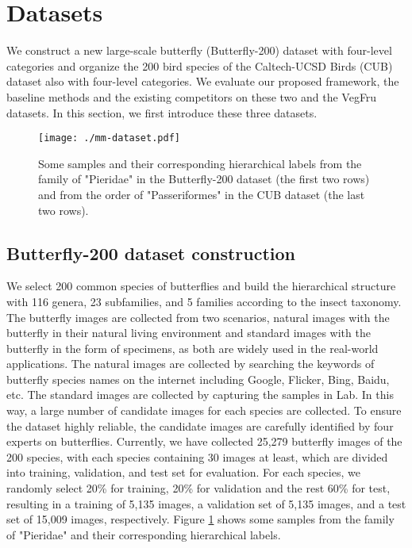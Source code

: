 \documentclass[sigconf]{acmart}
\begin{document}
\section{Datasets}
We construct a new large-scale butterfly (Butterfly-200) dataset with four-level categories and organize the 200 bird species of the Caltech-UCSD Birds (CUB) dataset also with four-level categories. We evaluate our proposed framework, the baseline methods and the existing competitors on these two and the VegFru ~\cite{hou2017vegfru} datasets. In this section, we first introduce these three datasets.


\begin{figure}[!t]
   \centering
   \texttt{[image: ./mm-dataset.pdf]} \caption{Some samples and their corresponding hierarchical labels from the family of "Pieridae" in the Butterfly-200 dataset (the first two rows) and from the order of "Passeriformes" in the CUB dataset (the last two rows).}
   \label{fig:dataset}
\end{figure} 

\subsection{Butterfly-200 dataset construction}
We select 200 common species of butterflies and build the hierarchical structure with 116 genera, 23 subfamilies, and 5 families according to the insect taxonomy. The butterfly images are collected from two scenarios, natural images with the butterfly in their natural living environment and standard images with the butterfly in the form of specimens, as both are widely used in the real-world applications. The natural images are collected by searching the keywords of butterfly species names on the internet including Google, Flicker, Bing, Baidu, etc. The standard images are collected by capturing the samples in Lab. In this way, a large number of candidate images for each species are collected. To ensure the dataset highly reliable, the candidate images are carefully identified by four experts on butterflies. Currently, we have collected 25,279 butterfly images of the 200 species, with each species containing 30 images at least, which are divided into training, validation, and test set for evaluation. For each species, we randomly select 20\% for training, 20\% for validation and the rest 60\% for test, resulting in a training of 5,135 images, a validation set of 5,135 images, and a test set of 15,009 images, respectively. Figure \ref{fig:dataset} shows some samples from the family of "Pieridae" and their corresponding hierarchical labels. 
\end{document}
